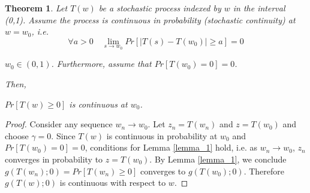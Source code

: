 \documentclass[12pt]{article} %
\newtheorem{thm}{Theorem}
\begin{document}

\begin{thm} \label{main_thm}
Let $T(w)$ be  a stochastic process indexed by $w$ in the interval (0,1). Assume  the process is continuous in probability  (stochastic continuity)   at $w=w_0$,  i.e.
\begin{equation} \forall a>0 \quad  \lim_{s \rightarrow w_0} Pr\left[\left|T(s)-T(w_0) \right| \geq a \right] = 0 
\end{equation}

 $ w_0\in (0,1)$. Furthermore, assume that $Pr\left[T(w_0)=0\right]=0$.

Then,

$Pr \left[ T(w) \geq 0\right]$ is continuous at $w_0$.
\end{thm}

\begin{proof}
Consider any sequence $w_n \rightarrow w_0$. Let $z_n = T(w_n)$ and  $z=T(w_0)$ and choose $\gamma=0$. Since $T(w)$ is continuous in probability at $w_0$ and $Pr\left[T(w_0)=0\right]=0$, conditions for Lemma \ref{lemma_1} hold, i.e. as $w_n\rightarrow w_0$, $z_n$ converges in probability to $z=T(w_0)$. By  Lemma \ref{lemma_1}, we conclude  $g(T(w_n); 0 ) = Pr \left[ T(w_n) \geq 0\right]$ converges to $g(T(w_0);0)$. Therefore $g(T(w);0)$ is continuous with respect to $w$.
\end{proof}
\end{document}
